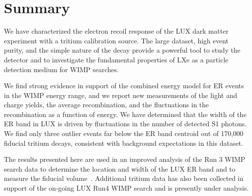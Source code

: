 \section{Summary}

We have characterized the electron recoil response of the LUX dark matter experiment with a tritium calibration source. The large dataset, high event purity, and the simple nature of the decay provide a powerful tool to study the detector and to investigate the fundamental properties of LXe as a particle detection medium for WIMP searches. 

We find strong evidence in support of the combined energy model for ER events in the WIMP energy range, and we report new measurements of the light and charge yields, the average recombination, and the fluctuations in the recombination as a function of energy. We have determined that the width of the ER band in LUX is driven by fluctuations in the number of detected S1 photons. We find only three outlier events far below the ER band centroid out of 170,000 fiducial tritium decays, consistent with background expectations in this dataset.

The results presented here are used in an improved analysis of the Run 3 WIMP search data to determine the location and width of the LUX ER band and to measure the fiducial volume~\cite{lux-reanalysis}. Additional tritium data has also been collected in support of the on-going LUX Run4 WIMP search and is presently under analysis.